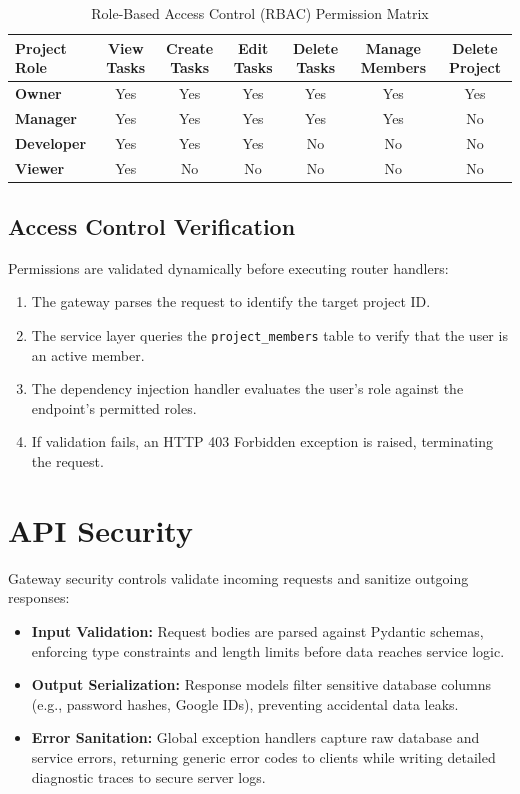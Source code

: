 \begin{table}[h!]
\centering
\small
\renewcommand{\arraystretch}{1.4}
\begin{tabularx}{\textwidth}{l C C C C C C}
    \toprule[1.5pt]
    \textbf{\color{primary}Project Role} & \textbf{\color{primary}View Tasks} & \textbf{\color{primary}Create Tasks} & \textbf{\color{primary}Edit Tasks} & \textbf{\color{primary}Delete Tasks} & \textbf{\color{primary}Manage Members} & \textbf{\color{primary}Delete Project} \\
    \midrule
    \textbf{Owner}     & Yes & Yes & Yes & Yes & Yes & Yes \\
    \textbf{Manager}   & Yes & Yes & Yes & Yes & Yes & No  \\
    \textbf{Developer} & Yes & Yes & Yes & No  & No  & No  \\
    \textbf{Viewer}    & Yes & No  & No  & No  & No  & No  \\
    \bottomrule[1.5pt]
\end{tabularx}
\caption{Role-Based Access Control (RBAC) Permission Matrix}
\label{tab:rbac_matrix}
\end{table}

\subsection{Access Control Verification}
Permissions are validated dynamically before executing router handlers:
\begin{enumerate}
    \item The gateway parses the request to identify the target project ID.
    \item The service layer queries the \texttt{project\_members} table to verify that the user is an active member.
    \item The dependency injection handler evaluates the user's role against the endpoint's permitted roles.
    \item If validation fails, an HTTP 403 Forbidden exception is raised, terminating the request.
\end{enumerate}

\section{API Security}
Gateway security controls validate incoming requests and sanitize outgoing responses:
\begin{itemize}
    \item \textbf{Input Validation:} Request bodies are parsed against Pydantic schemas, enforcing type constraints and length limits before data reaches service logic.
    \item \textbf{Output Serialization:} Response models filter sensitive database columns (e.g., password hashes, Google IDs), preventing accidental data leaks.
    \item \textbf{Error Sanitation:} Global exception handlers capture raw database and service errors, returning generic error codes to clients while writing detailed diagnostic traces to secure server logs.
\end{itemize}

